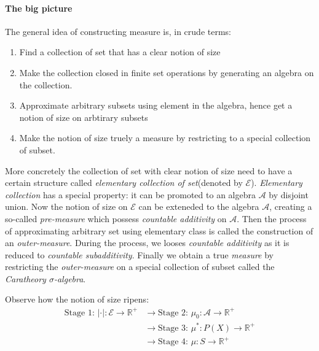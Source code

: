 \paragraph{The big picture}

The general idea of constructing measure is, in crude terms:

\begin{enumerate}
\item Find a collection of set that has a clear notion of size
\item Make the collection closed in finite set operations by generating an algebra on the collection.
\item Approximate arbitrary subsets using element in the algebra, hence get a notion of size on arbtirary subsets
\item Make the notion of size truely a measure by restricting to a special collection of subset.
\end{enumerate}

More concretely the collection of set with clear notion of size need to have a certain structure called \textit{elementary collection of set}(denoted by $\mathcal E$).  \textit{Elementary collection} has a special property: it can be promoted to an algebra $\mathcal A$ by disjoint union. Now the notion of size on $\mathcal E$ can be exteneded to the algebra $\mathcal A$, creating a so-called \textit{pre-measure} which possess \textit{countable additivity} on $\mathcal A$. Then the process of approximating arbitrary set using elementary class
is called the construction of an \textit{outer-measure}. During the process, we looses \textit{countable additivity} as it is reduced to \textit{countable subadditivity}. Finally we obtain a true \textit{measure} by restricting the \textit{outer-measure} on a special collection of subset called the \textit{Caratheory $\sigma$-algebra}.

Observe how the notion of size ripens:
\begin{equation}
\begin{aligned}
\text{Stage 1: $\boxed{|\cdot|:\mathcal E \to \mathbb{R}^+}$} 
&\longrightarrow \text{Stage 2: $\boxed{\mu_0: \mathcal A \to  \mathbb{R}^+}$} \\ 
&\longrightarrow \text{Stage 3: $\boxed{\mu^* : P(X)\to \mathbb{R}^+}$} \\ 
&\longrightarrow \text{Stage 4: $\boxed{\mu: S \to \mathbb{R}^{+}}$}
\end{aligned}
\end{equation}

